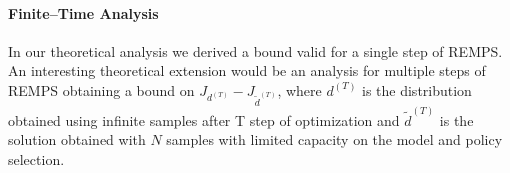 \paragraph{Finite--Time Analysis}
In our theoretical analysis we derived a bound valid for a single step of REMPS. An interesting theoretical extension would be an analysis for multiple steps of REMPS obtaining a bound on $J_{d^{(T)}} - J_{\widetilde{d}^{(T)}}$, where $d^{(T)}$ is the distribution obtained using infinite samples after T step of optimization and $\widetilde{d}^{(T)}$ is the solution obtained with $N$ samples with limited capacity on the model and policy selection.